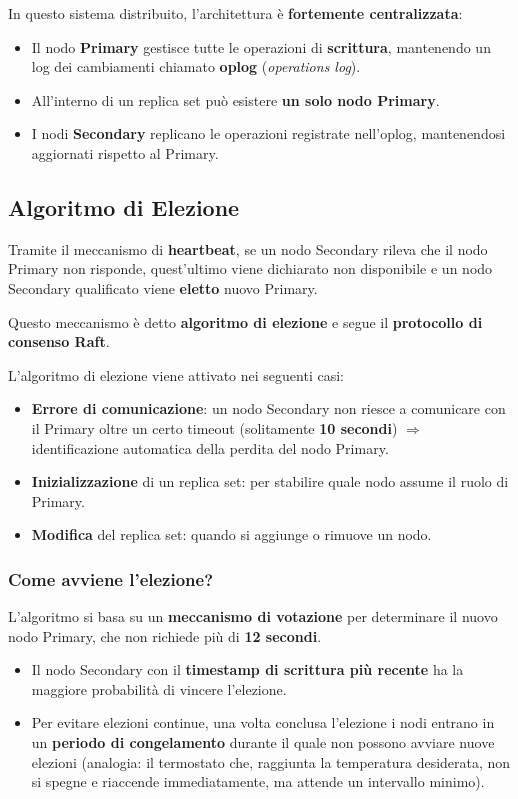 In questo sistema distribuito, l'architettura è \textbf{fortemente centralizzata}:

\begin{itemize}
	\item Il nodo \textbf{Primary} gestisce tutte le operazioni di \textbf{scrittura}, mantenendo un log dei cambiamenti chiamato \textbf{oplog} (\textit{operations log}).
	\item All'interno di un replica set può esistere \textbf{un solo nodo Primary}.
	\item I nodi \textbf{Secondary} replicano le operazioni registrate nell'oplog, mantenendosi aggiornati rispetto al Primary.
\end{itemize}
\subsection*{Algoritmo di Elezione}

Tramite il meccanismo di \textbf{heartbeat}, se un nodo Secondary rileva che il nodo Primary non risponde, quest'ultimo viene dichiarato non disponibile e un nodo Secondary qualificato viene \textbf{eletto} nuovo Primary.

Questo meccanismo è detto \textbf{algoritmo di elezione} e segue il \textbf{protocollo di consenso Raft}.

\medskip
L'algoritmo di elezione viene attivato nei seguenti casi:

\begin{itemize}
	\item \textbf{Errore di comunicazione}: un nodo Secondary non riesce a comunicare con il Primary oltre un certo timeout (solitamente \textbf{10 secondi}) $\Rightarrow$ identificazione automatica della perdita del nodo Primary.
	\item \textbf{Inizializzazione} di un replica set: per stabilire quale nodo assume il ruolo di Primary.
	\item \textbf{Modifica} del replica set: quando si aggiunge o rimuove un nodo.
\end{itemize}

\subsubsection*{Come avviene l'elezione?}

L'algoritmo si basa su un \textbf{meccanismo di votazione} per determinare il nuovo nodo Primary, che non richiede più di \textbf{12 secondi}.

\begin{itemize}
	\item Il nodo Secondary con il \textbf{timestamp di scrittura più recente} ha la maggiore probabilità di vincere l'elezione.
	\item Per evitare elezioni continue, una volta conclusa l'elezione i nodi entrano in un \textbf{periodo di congelamento} durante il quale non possono avviare nuove elezioni (analogia: il termostato che, raggiunta la temperatura desiderata, non si spegne e riaccende immediatamente, ma attende un intervallo minimo).
\end{itemize}

